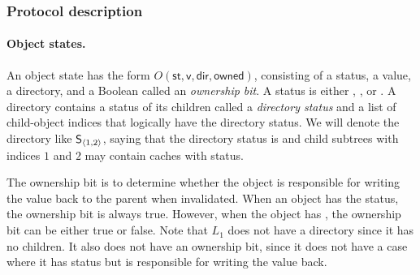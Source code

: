 \documentclass[sigplan,10pt,review,anonymous,screen]{acmart}\settopmatter{printfolios=true,printccs=false,printacmref=false}
\begin{document}
\subsubsection{Protocol description}

\paragraph{Object states.}
An object state has the form $O(\textsf{st}, \textsf{v}, \textsf{dir}, \textsf{owned})$, consisting of a status, a value, a directory, and a Boolean called an \emph{ownership bit}.
A status is either \stM{}, \stS{}, or \stI{}.
A directory contains a status of its children called a \emph{directory status} and a list of child-object indices that logically have the directory status.
We will denote the directory like $\textsf{S}{}_{\langle 1, 2 \rangle}$, saying that the directory status is \stS{} and child subtrees with indices $1$ and $2$ may contain caches with \stS{} status.

The ownership bit is to determine whether the object is responsible for writing the value back to the parent when invalidated.
When an object has the \stM{} status, the ownership bit is always true.
However, when the object has \stS{}, the ownership bit can be either true or false.
Note that $L_1$ does not have a directory since it has no children.
It also does not have an ownership bit, since it does not have a case where it has \stS{} status but is responsible for writing the value back.
\end{document}
